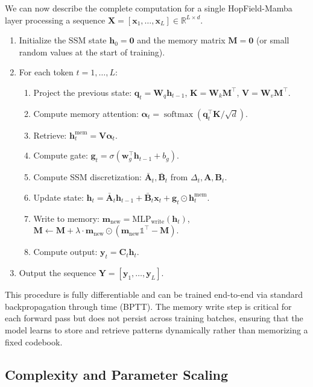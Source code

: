 \documentclass[journal,10pt]{IEEEtran}
\newcommand{\R}{\mathbb{R}}
\newcommand{\softmax}{\operatorname{softmax}}
\begin{document}
We can now describe the complete computation for a single HopField-Mamba layer processing a sequence $\bm{X} = [\bm{x}_1, \dots, \bm{x}_L] \in \R^{L \times d}$.

\begin{enumerate}
    \item Initialize the SSM state $\bm{h}_0 = \bm{0}$ and the memory matrix $\bm{M} = \bm{0}$ (or small random values at the start of training).
    \item For each token $t = 1, \dots, L$:
    \begin{enumerate}
        \item Project the previous state: $\bm{q}_t = \bm{W}_q \bm{h}_{t-1}$, $\bm{K} = \bm{W}_k \bm{M}^\top$, $\bm{V} = \bm{W}_v \bm{M}^\top$.
        \item Compute memory attention: $\bm{\alpha}_t = \softmax(\bm{q}_t^\top \bm{K} / \sqrt{d})$.
        \item Retrieve: $\bm{h}_t^{\text{mem}} = \bm{V} \bm{\alpha}_t$.
        \item Compute gate: $\bm{g}_t = \sigma(\bm{w}_g^\top \bm{h}_{t-1} + b_g)$.
        \item Compute SSM discretization: $\bar{\bm{A}}_t, \bar{\bm{B}}_t$ from $\Delta_t, \bm{A}, \bm{B}_t$.
        \item Update state: $\bm{h}_t = \bar{\bm{A}}_t \bm{h}_{t-1} + \bar{\bm{B}}_t \bm{x}_t + \bm{g}_t \odot \bm{h}_t^{\text{mem}}$.
        \item Write to memory: $\bm{m}_{\text{new}} = \text{MLP}_{\text{write}}(\bm{h}_t)$, $\bm{M} \leftarrow \bm{M} + \lambda \cdot \bm{m}_{\text{new}} \odot (\bm{m}_{\text{new}} \mathbb{1}^\top - \bm{M})$.
        \item Compute output: $\bm{y}_t = \bm{C}_t \bm{h}_t$.
    \end{enumerate}
    \item Output the sequence $\bm{Y} = [\bm{y}_1, \dots, \bm{y}_L]$.
\end{enumerate}

This procedure is fully differentiable and can be trained end-to-end via standard backpropagation through time (BPTT). The memory write step is critical for each forward pass but does not persist across training batches, ensuring that the model learns to store and retrieve patterns dynamically rather than memorizing a fixed codebook.

\subsection{Complexity and Parameter Scaling}
\label{sec:complexity}
\end{document}

